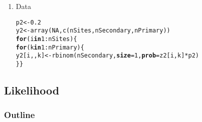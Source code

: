 \documentclass[color=usenames,dvipsnames]{beamer}\usepackage[]{graphicx}\usepackage[]{color}
\makeatletter
\newcommand{\hlnum}[1]{\textcolor[rgb]{0.69,0.494,0}{#1}}%
\newcommand{\hlopt}[1]{\textcolor[rgb]{0,0,0}{#1}}%
\newcommand{\hlstd}[1]{\textcolor[rgb]{0,0,0}{#1}}%
\newcommand{\hlkwa}[1]{\textcolor[rgb]{0,0,0}{\textbf{#1}}}%
\newcommand{\hlkwb}[1]{\textcolor[rgb]{0,0.341,0.682}{#1}}%
\newcommand{\hlkwc}[1]{\textcolor[rgb]{0,0,0}{\textbf{#1}}}%
\newcommand{\hlkwd}[1]{\textcolor[rgb]{0.004,0.004,0.506}{#1}}%
\newenvironment{kframe}{%
 \def\at@end@of@kframe{}%
 \ifinner\ifhmode%
  \def\at@end@of@kframe{\end{minipage}}%
  \begin{minipage}{\columnwidth}%
 \fi\fi%
 \def\FrameCommand##1{\hskip\@totalleftmargin \hskip-\fboxsep
 \colorbox{shadecolor}{##1}\hskip-\fboxsep
     \hskip-\linewidth \hskip-\@totalleftmargin \hskip\columnwidth}%
 \MakeFramed {\advance\hsize-\width
   \@totalleftmargin\z@ \linewidth\hsize
   \@setminipage}}%
 {\par\unskip\endMakeFramed%
 \at@end@of@kframe}
\newenvironment{knitrout}{}{} %
\makeatother
\begin{document}
\begin{frame}[fragile]
\begin{enumerate}[<+->]
\begin{knitrout}
\begin{kframe}
\end{kframe}
\end{knitrout}
  \item Data
\begin{knitrout}\tiny
{}\color{fgcolor}\begin{kframe}
\begin{alltt}
\hlstd{p2} \hlkwb{<-} \hlnum{0.2}
\hlstd{y2} \hlkwb{<-} \hlkwd{array}\hlstd{(}\hlnum{NA}\hlstd{,} \hlkwd{c}\hlstd{(nSites, nSecondary, nPrimary))}
\hlkwa{for}\hlstd{(i} \hlkwa{in} \hlnum{1}\hlopt{:}\hlstd{nSites) \{}
    \hlkwa{for}\hlstd{(k} \hlkwa{in} \hlnum{1}\hlopt{:}\hlstd{nPrimary) \{}
        \hlstd{y2[i,,k]} \hlkwb{<-} \hlkwd{rbinom}\hlstd{(nSecondary,} \hlkwc{size}\hlstd{=}\hlnum{1}\hlstd{,} \hlkwc{prob}\hlstd{=z2[i,k]}\hlopt{*}\hlstd{p2)}
    \hlstd{\} \}}
\end{alltt}
\end{kframe}
\end{knitrout}
\end{enumerate}
\end{frame}






\subsection{Likelihood}

\begin{frame}
  \frametitle{Outline}
  \Large
  \tableofcontents[currentsection]
\end{frame}
\end{document}
